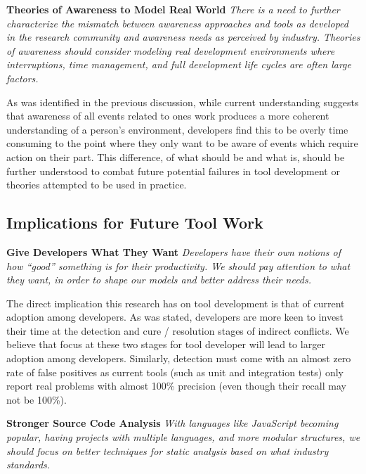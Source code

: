 \documentclass[conference]{IEEEtran}
\begin{document}
\textbf{Theories of Awareness to Model Real World} \textit{There is a need to further characterize the
mismatch between awareness approaches and tools as developed in the research community and awareness needs as perceived
by industry. Theories of awareness should consider modeling real development
environments where interruptions, time management, and full development life cycles are often large factors.}

As was identified in the previous discussion, while current understanding suggests that awareness of all events related to ones work
produces a more coherent understanding of a person's environment, developers find this to be overly time consuming
to the point where they only want to be aware of events which require action on their part. This difference, of what
should be and what is, should be further understood to combat future potential failures in
tool development or theories attempted to be used in practice.

\subsection{Implications for Future Tool Work}
\label{sec:implt}

\textbf{Give Developers What They Want} \textit{Developers have their own notions of how ``good''
something is for their productivity. We should pay attention to what they want, in order to shape our
models and better address their needs.}

The direct implication this research has on tool development is that of current adoption among developers. As was stated,
developers are more keen to invest their time at the detection and cure / resolution stages of indirect conflicts. We believe that focus at these two stages for tool developer will lead to larger adoption among developers.
Similarly, detection must come with an almost zero rate of false positives as current tools (such as unit and integration tests) only report real problems with almost 100\% precision (even though their recall may not be 100\%).


\textbf{Stronger Source Code Analysis} \textit{With languages like JavaScript becoming popular, having projects with
multiple languages, and more modular structures, we should focus on better techniques for static analysis based
on what industry standards.}
\end{document}
